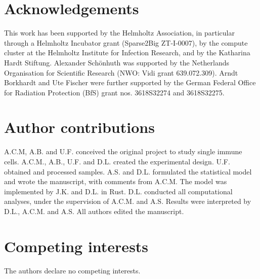 \documentclass[12pt,inline]{wlscirep}
\begin{document}
\section*{Acknowledgements}

This work has been supported by the Helmholtz Association, in particular through a Helmholtz Incubator grant (Sparse2Big ZT-I-0007), by the compute cluster at the Helmholtz Institute for Infection Research, and by the Katharina Hardt Stiftung.
Alexander Schönhuth was supported by the Netherlands Organisation for Scientific Research (NWO: Vidi grant 639.072.309).
Arndt Borkhardt and Ute Fischer were further supported by the German Federal Office for Radiation Protection (BfS) grant nos. 3618S32274 and 3618S32275.

\section*{Author contributions}

A.C.M, A.B. and U.F. conceived the original project to study single immune cells.
A.C.M., A.B., U.F. and D.L. created the experimental design.
U.F. obtained and processed samples.
A.S. and D.L. formulated the statistical model and wrote the manuscript, with comments from A.C.M.
The model was implemented by J.K. and D.L. in Rust.
D.L. conducted all computational analyses, under the supervision of A.C.M. and A.S.
Results were interpreted by D.L., A.C.M. and A.S.
All authors edited the manuscript.

\section*{Competing interests}
The authors declare no competing interests.
\end{document}
